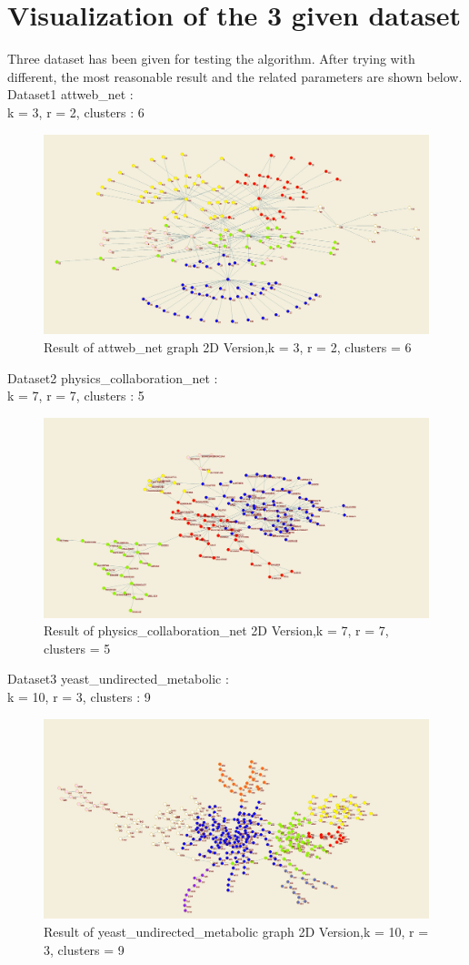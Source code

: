 \documentclass[paper=letter, fontsize=11pt]{article}
\numberwithin{equation}{section}		%
\numberwithin{figure}{section}			%
\numberwithin{table}{section}				%
\begin{document}
\section{Visualization of the 3 given dataset}
Three dataset has been given for testing the algorithm. After trying with different, the most reasonable result and the related parameters are shown below.\\
Dataset1 attweb\_net :\\
k = 3, r = 2, clusters : 6\\
\begin{figure}[H]
	\centering
	\includegraphics[width=1\textwidth]{attweb_net_6.jpg}
	\caption{Result of attweb\_net graph 2D Version,k = 3, r = 2, clusters = 6}
\end{figure}
Dataset2 physics\_collaboration\_net :\\
k = 7, r = 7, clusters : 5\\
\begin{figure}[H]
	\centering
	\includegraphics[width=1\textwidth]{physics_c5_k7_r7.jpg}
	\caption{Result of physics\_collaboration\_net 2D Version,k = 7, r = 7, clusters = 5}
\end{figure}
Dataset3 yeast\_undirected\_metabolic :\\
k = 10, r = 3, clusters : 9\\
\begin{figure}[H]
	\centering
	\includegraphics[width=1\textwidth]{yeast_c9_k10_r3.jpg}
	\caption{Result of yeast\_undirected\_metabolic graph 2D Version,k = 10, r = 3, clusters = 9}
\end{figure}
\end{document}
